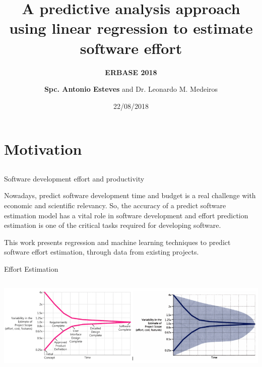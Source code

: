 \documentclass{beamer}
\author[]{\textbf{Spc. Antonio Esteves} and Dr. Leonardo M. Medeiros}
\date{22/08/2018}
\institute[]{Federal Institute of Alagoas - BRAZIL
}
\title{A predictive analysis approach using linear regression to estimate software effort}
\subtitle{\textbf{ERBASE 2018}}
\begin{document}
\begin{frame}
  \titlepage
\end{frame}

{
}

\section{Motivation}
\subsection{}
\begin{frame}{Software development effort and productivity}
	\begin{block}{}
	Nowadays, predict software development time and budget is a real challenge with economic and scientific relevancy. So, the accuracy of a predict software estimation model has a vital role in software development and effort prediction estimation is one of the critical tasks required for developing software.
	\end{block}

  \begin{block}{}
  	This work presents regression and machine learning techniques to predict software effort estimation, through data from existing projects.
  \end{block} 
\end{frame}

\begin{frame}{Effort Estimation}
  \begin{block}{}
  \end{block}  
	\begin{block}{}
	\centering
    \includegraphics[height=4.65cm,width=4.6 in]{img/uncertainty_cone.png}\hspace*{\fill}
	\end{block}
\end{frame}
\end{document}
